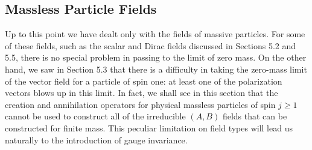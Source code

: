 
\subsection{Massless Particle Fields}

Up to this point we have dealt only with the fields of massive particles. For
some of these fields, such as the scalar and Dirac fields discussed in
Sections 5.2 and 5.5, there is no special problem in passing to the limit of
zero mass. On the other hand, we saw in Section 5.3 that there is a difficulty
in taking the zero-mass limit of the vector field for a particle of spin one:
at least one of the polarization vectors blows up in this limit. In fact, we
shall see in this section that the creation and annihilation operators for
physical massless particles of spin $j\geq1$ cannot be used to construct all of
the irreducible $(A,B)$ fields that can be constructed for finite mass. This
peculiar limitation on field types will lead us naturally to the introduction
of gauge invariance.

